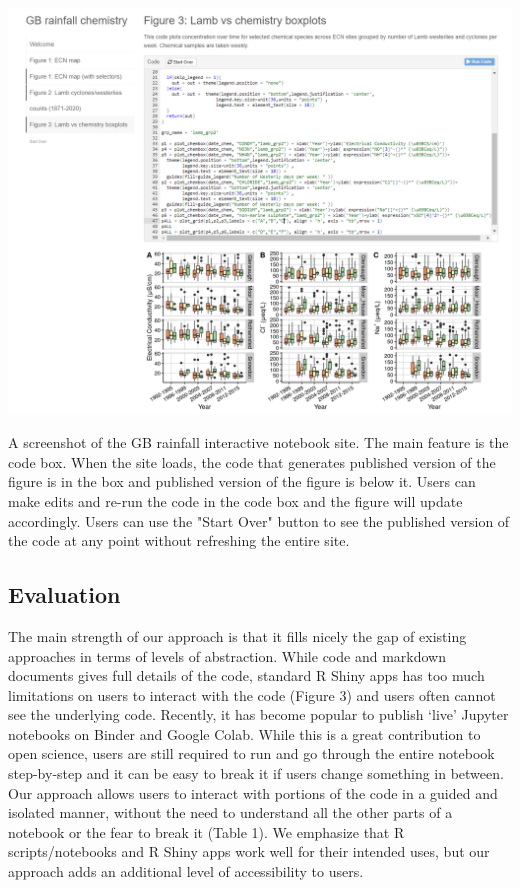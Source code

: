 \begin{Schunk}
\begin{widefigure}
\includegraphics[width=\textwidth]{GB_notebook_screenshot} \caption[A screenshot of the GB rainfall interactive notebook site]{A screenshot of the GB rainfall interactive notebook site. The main feature is the code box. When the site loads, the code that generates published version of the figure is in the box and published version of the figure is below it. Users can make edits and re-run the code in the code box and the figure will update accordingly. Users can use the "Start Over" button to see the published version of the code at any point without refreshing the entire site.}\label{fig:fig2}
\end{widefigure}
\end{Schunk}

\hypertarget{evaluation}{%
\subsection{Evaluation}\label{evaluation}}

The main strength of our approach is that it fills nicely the gap of
existing approaches in terms of levels of abstraction. While code and
markdown documents gives full details of the code, standard R Shiny apps
has too much limitations on users to interact with the code (Figure 3)
and users often cannot see the underlying code. Recently, it has become
popular to publish `live' Jupyter notebooks on Binder and Google Colab.
While this is a great contribution to open science, users are still
required to run and go through the entire notebook step-by-step and it
can be easy to break it if users change something in between. Our
approach allows users to interact with portions of the code in a guided
and isolated manner, without the need to understand all the other parts
of a notebook or the fear to break it (Table 1). We emphasize that R
scripts/notebooks and R Shiny apps work well for their intended uses,
but our approach adds an additional level of accessibility to users.

